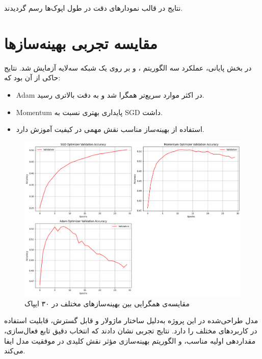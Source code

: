 	نتایج در قالب نمودارهای دقت در طول اپوک‌ها رسم گردیدند.
	
	\section*{مقایسه تجربی بهینه‌سازها}
	
	در بخش پایانی، عملکرد سه الگوریتم ،  و  بر روی یک شبکه سه‌لایه آزمایش شد. نتایج حاکی از آن بود که:
	
	\begin{itemize}
		\item Adam در اکثر موارد سریع‌تر همگرا شد و به دقت بالاتری رسید.
		\item Momentum پایداری بهتری نسبت به SGD داشت.
		\item استفاده از بهینه‌ساز مناسب نقش مهمی در کیفیت آموزش دارد.
	\end{itemize}
		
	\begin{figure}[h]
		\centering
		\includegraphics[width=0.7\linewidth]{images/task4-1}
		\caption{مقایسه‌ی همگرایی بین بهینه‌سازهای مختلف در ۳۰ ایپاک}
		\label{fig:task4-1}
	\end{figure}
	
	
	مدل طراحی‌شده در این پروژه به‌دلیل ساختار ماژولار و قابل گسترش، قابلیت استفاده در کاربردهای مختلف را دارد. نتایج تجربی نشان دادند که انتخاب دقیق تابع فعال‌سازی، مقداردهی اولیه مناسب، و الگوریتم بهینه‌سازی مؤثر نقش کلیدی در موفقیت مدل ایفا می‌کند.
	
